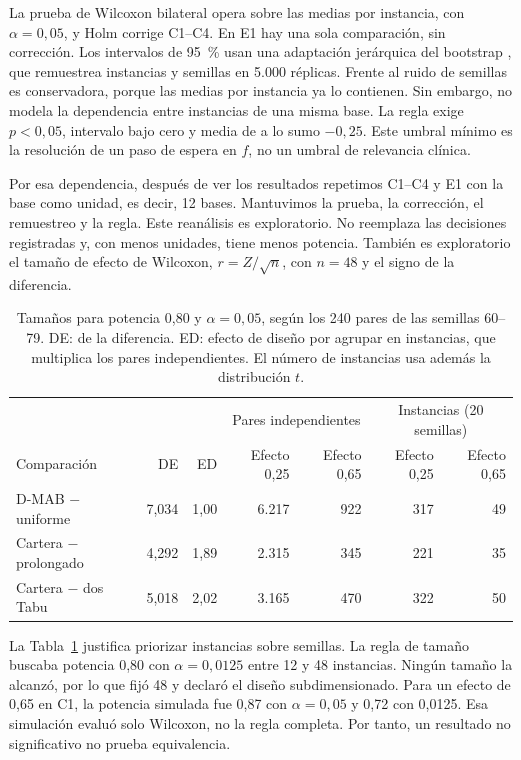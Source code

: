 La prueba de Wilcoxon bilateral \parencite{wilcoxon1945} opera sobre las medias por
instancia, con $\alpha=0{,}05$, y Holm \parencite{holm1979} corrige C1--C4. En E1 hay una
sola comparación, sin corrección. Los
intervalos de 95~\% usan una adaptación jerárquica del bootstrap
\parencite{efron1979}, que remuestrea instancias y semillas en 5.000 réplicas. Frente
al ruido de semillas es conservadora, porque las medias por instancia ya lo contienen.
Sin embargo, no modela la dependencia entre instancias de una misma base. La
regla exige $p<0{,}05$, intervalo bajo cero y media de a lo sumo $-0{,}25$.
Este umbral mínimo es la resolución de un paso de espera en $f$, no un umbral de
relevancia clínica.

Por esa dependencia, después de ver los resultados repetimos C1--C4 y E1 con la base
como unidad, es decir, 12 bases. Mantuvimos la prueba, la corrección, el remuestreo y la
regla. Este reanálisis es exploratorio. No reemplaza las decisiones registradas y, con menos
unidades, tiene menos potencia. También es exploratorio el tamaño de efecto de Wilcoxon,
$r=Z/\sqrt{n}$, con $n=48$ y el signo de la diferencia.

\begin{table}[!ht]
 \centering\footnotesize
 \caption{Tamaños para potencia 0,80 y $\alpha=0{,}05$, según los 240 pares de las semillas 60--79. DE: de la diferencia. ED: efecto de diseño por agrupar en instancias, que multiplica los pares independientes. El número de instancias usa además la distribución $t$.}
 \label{tab:potencia}
 \begin{tabular}{@{}lrrrrrr@{}}
  \toprule
  & & & \multicolumn{2}{c}{Pares independientes} & \multicolumn{2}{c}{Instancias (20 semillas)}\\
  Comparación & DE & ED & Efecto 0,25 & Efecto 0,65 & Efecto 0,25 & Efecto 0,65\\
  \midrule
  D-MAB $-$ uniforme & 7,034 & 1,00 & 6.217 & 922 & 317 & 49\\
  Cartera $-$ prolongado & 4,292 & 1,89 & 2.315 & 345 & 221 & 35\\
  Cartera $-$ dos Tabu & 5,018 & 2,02 & 3.165 & 470 & 322 & 50\\
  \bottomrule
 \end{tabular}
\end{table}

La Tabla~\ref{tab:potencia} justifica priorizar instancias sobre semillas. La regla
de tamaño buscaba potencia 0,80 con $\alpha=0{,}0125$ entre 12 y 48 instancias. Ningún
tamaño la alcanzó, por lo que fijó 48 y declaró el diseño subdimensionado. Para un
efecto de 0,65 en C1, la potencia simulada fue 0,87 con $\alpha=0{,}05$ y 0,72 con
0,0125. Esa simulación evaluó solo Wilcoxon, no la regla completa. Por tanto, un
resultado no significativo no prueba equivalencia.


